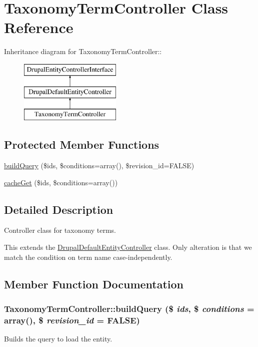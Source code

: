 \hypertarget{classTaxonomyTermController}{
\section{TaxonomyTermController Class Reference}
\label{classTaxonomyTermController}
}
Inheritance diagram for TaxonomyTermController::\begin{figure}[H]
\begin{center}
\leavevmode
\includegraphics[height=3cm]{classTaxonomyTermController}
\end{center}
\end{figure}
\subsection*{Protected Member Functions}
\begin{DoxyCompactItemize}
\item 
\hyperlink{classTaxonomyTermController_a38102da86b43fb5b2c3c3412cb2ba3d2}{buildQuery} (\$ids, \$conditions=array(), \$revision\_\-id=FALSE)
\item 
\hyperlink{classTaxonomyTermController_a9bfba8c802d79ed1dcdfbfbe915adf1b}{cacheGet} (\$ids, \$conditions=array())
\end{DoxyCompactItemize}


\subsection{Detailed Description}
Controller class for taxonomy terms.

This extends the \hyperlink{classDrupalDefaultEntityController}{DrupalDefaultEntityController} class. Only alteration is that we match the condition on term name case-\/independently. 

\subsection{Member Function Documentation}
\hypertarget{classTaxonomyTermController_a38102da86b43fb5b2c3c3412cb2ba3d2}{
\subsubsection[{buildQuery}]{\setlength{\rightskip}{0pt plus 5cm}TaxonomyTermController::buildQuery (\$ {\em ids}, \/  \$ {\em conditions} = {\ttfamily array()}, \/  \$ {\em revision\_\-id} = {\ttfamily FALSE})}}
\label{classTaxonomyTermController_a38102da86b43fb5b2c3c3412cb2ba3d2}
Builds the query to load the entity.

